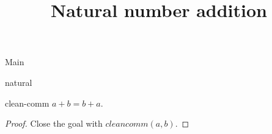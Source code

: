 \begin{lexlean}{Main}
\title{Natural number addition}

\begin{section}{natural}
  \begin{theorem}{clean-comm}
  \noaxioms
  \(a + b = b + a\).
  \begin{proof}
  Close the goal with \(cleancomm(a, b)\).
  \end{proof}
  \end{theorem}
\end{section}
\end{lexlean}
